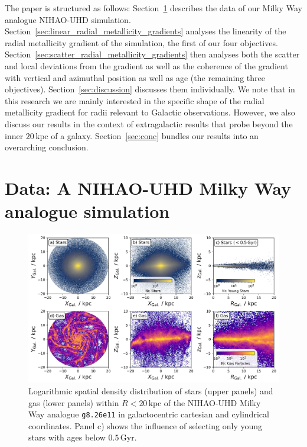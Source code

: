 \documentclass[fleqn,usenatbib]{mnras}
\newcommand{\nihaoAGEmax}{$0.5\,\mathrm{Gyr}$}
\begin{document}
The paper is structured as follows: Section~\ref{sec:data} describes the data of our Milky Way analogue NIHAO-UHD simulation. Section~\ref{sec:linear_radial_metallicity_gradients} analyses the linearity of the radial metallicity gradient of the simulation, the first of our four objectives. Section~\ref{sec:scatter_radial_metallicity_gradients} then analyses both the scatter and local deviations from the gradient as well as the coherence of the gradient with vertical and azimuthal position as well as age (the remaining three objectives). Section~\ref{sec:discussion} discusses them individually. We note that in this research we are mainly interested in the specific shape of the radial metallicity gradient for radii relevant to Galactic observations. However, we also discuss our results in the context of extragalactic results that probe beyond the inner $20\,\mathrm{kpc}$ of a galaxy. Section~\ref{sec:conc} bundles our results into an overarching conclusion. 

\section{Data: A NIHAO-UHD Milky Way analogue simulation} \label{sec:data}

\begin{figure}
    \centering
    \includegraphics[width=\textwidth]{figures/stars_and_gas_overview.png}
    \caption{Logarithmic spatial density distribution of stars (upper panels) and gas (lower panels) within $R < 20\,\mathrm{kpc}$ of the NIHAO-UHD Milky Way analogue \texttt{g8.26e11} in galactocentric cartesian and cylindrical coordinates. Panel c) shows the influence of selecting only young stars with ages below \nihaoAGEmax.}
    \label{fig:stars_and_gas_overview}
\end{figure}
\end{document}
